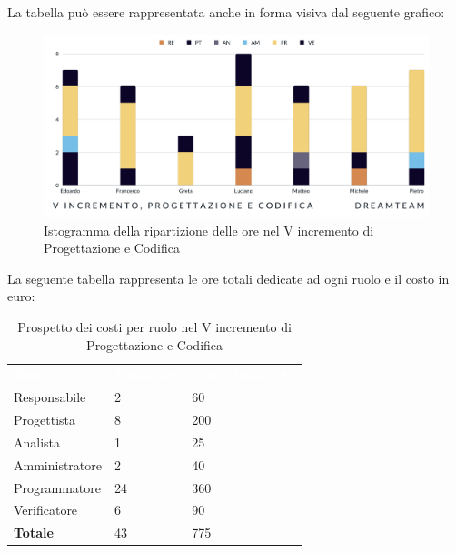 La tabella può essere rappresentata anche in forma visiva dal seguente grafico:
\begin{figure}[H]
\centering
\includegraphics[scale=0.50]{Sezioni/SezioniPreventivo/grafici/progettazione/Progettazione_V_incremento.png}
\caption{Istogramma della ripartizione delle ore nel V incremento di Progettazione e Codifica}
\end{figure}

La seguente tabella rappresenta le ore totali dedicate ad ogni ruolo e il costo in euro:

\begin{table}[H]
\begin{center}
\renewcommand{\arraystretch}{1.5}
\begin{tabular}{ m{}<{\centering}  m{}<{\centering} m{}<{\centering}}
	\rowcolor{darkblue}
	\textcolor{white}{\textbf{Ruolo}}&\textcolor{white}{\textbf{Totale ore}}&\textcolor{white}{\textbf{Costo totale (\euro)}}\\ 

	Responsabile  & 2 & 60 \\	
	
	Progettista & 8 & 200 \\
	
	Analista & 1 & 25 \\

	Amministratore & 2 & 40 \\
	
	Programmatore & 24 & 360 \\
	
	Verificatore & 6 & 90 \\
	
	\textbf{Totale} & 43 & 775 \\
	
\end{tabular}
\caption{Prospetto dei costi per ruolo nel V incremento di Progettazione e Codifica}
\end{center}
\end{table}

